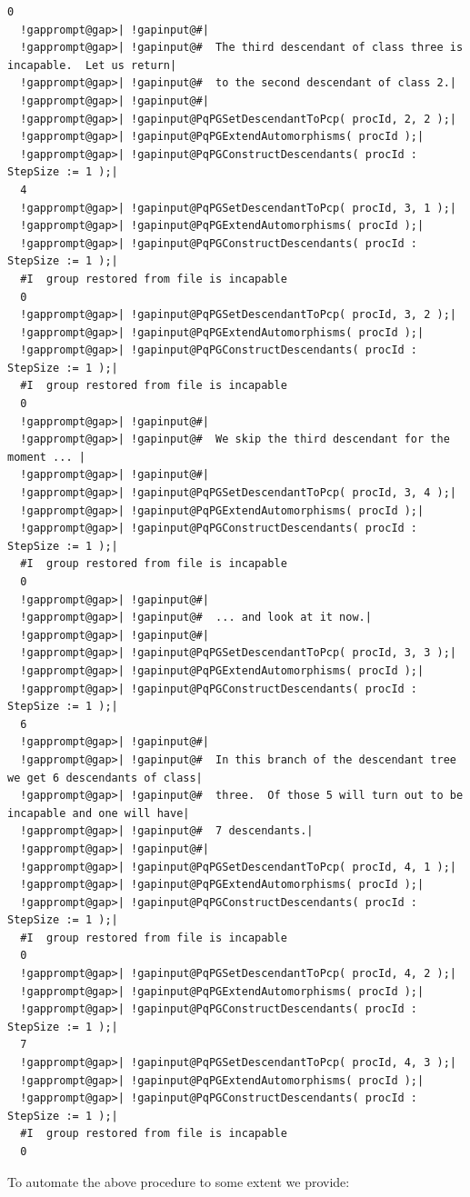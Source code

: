 \documentclass[a4paper,11pt]{report}
\begin{document}
{{\begin{Verbatim}[commandchars=!@|,fontsize=\small,frame=single,label=Example]
  0
  !gapprompt@gap>| !gapinput@#|
  !gapprompt@gap>| !gapinput@#  The third descendant of class three is incapable.  Let us return|
  !gapprompt@gap>| !gapinput@#  to the second descendant of class 2.|
  !gapprompt@gap>| !gapinput@#|
  !gapprompt@gap>| !gapinput@PqPGSetDescendantToPcp( procId, 2, 2 );|
  !gapprompt@gap>| !gapinput@PqPGExtendAutomorphisms( procId );|
  !gapprompt@gap>| !gapinput@PqPGConstructDescendants( procId : StepSize := 1 );|
  4
  !gapprompt@gap>| !gapinput@PqPGSetDescendantToPcp( procId, 3, 1 );|
  !gapprompt@gap>| !gapinput@PqPGExtendAutomorphisms( procId );|
  !gapprompt@gap>| !gapinput@PqPGConstructDescendants( procId : StepSize := 1 );|
  #I  group restored from file is incapable
  0
  !gapprompt@gap>| !gapinput@PqPGSetDescendantToPcp( procId, 3, 2 );|
  !gapprompt@gap>| !gapinput@PqPGExtendAutomorphisms( procId );|
  !gapprompt@gap>| !gapinput@PqPGConstructDescendants( procId : StepSize := 1 );|
  #I  group restored from file is incapable
  0
  !gapprompt@gap>| !gapinput@#|
  !gapprompt@gap>| !gapinput@#  We skip the third descendant for the moment ... |
  !gapprompt@gap>| !gapinput@#|
  !gapprompt@gap>| !gapinput@PqPGSetDescendantToPcp( procId, 3, 4 );|
  !gapprompt@gap>| !gapinput@PqPGExtendAutomorphisms( procId );|
  !gapprompt@gap>| !gapinput@PqPGConstructDescendants( procId : StepSize := 1 );|
  #I  group restored from file is incapable
  0
  !gapprompt@gap>| !gapinput@#|
  !gapprompt@gap>| !gapinput@#  ... and look at it now.|
  !gapprompt@gap>| !gapinput@#|
  !gapprompt@gap>| !gapinput@PqPGSetDescendantToPcp( procId, 3, 3 );|
  !gapprompt@gap>| !gapinput@PqPGExtendAutomorphisms( procId );|
  !gapprompt@gap>| !gapinput@PqPGConstructDescendants( procId : StepSize := 1 );|
  6
  !gapprompt@gap>| !gapinput@#|
  !gapprompt@gap>| !gapinput@#  In this branch of the descendant tree we get 6 descendants of class|
  !gapprompt@gap>| !gapinput@#  three.  Of those 5 will turn out to be incapable and one will have|
  !gapprompt@gap>| !gapinput@#  7 descendants.|
  !gapprompt@gap>| !gapinput@#|
  !gapprompt@gap>| !gapinput@PqPGSetDescendantToPcp( procId, 4, 1 );|
  !gapprompt@gap>| !gapinput@PqPGExtendAutomorphisms( procId );|
  !gapprompt@gap>| !gapinput@PqPGConstructDescendants( procId : StepSize := 1 );|
  #I  group restored from file is incapable
  0
  !gapprompt@gap>| !gapinput@PqPGSetDescendantToPcp( procId, 4, 2 );|
  !gapprompt@gap>| !gapinput@PqPGExtendAutomorphisms( procId );|
  !gapprompt@gap>| !gapinput@PqPGConstructDescendants( procId : StepSize := 1 );|
  7
  !gapprompt@gap>| !gapinput@PqPGSetDescendantToPcp( procId, 4, 3 );|
  !gapprompt@gap>| !gapinput@PqPGExtendAutomorphisms( procId );|
  !gapprompt@gap>| !gapinput@PqPGConstructDescendants( procId : StepSize := 1 );|
  #I  group restored from file is incapable
  0
\end{Verbatim}
 To automate the above procedure to some extent we provide: 

}}
\end{document}
